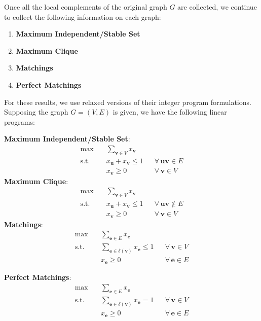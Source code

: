 \documentclass[12pt]{report} %
\begin{document}
\newpage 

Once all the local complements of the original graph $G$ are collected, we continue to 
collect the following information on each graph: 

\begin{enumerate}[label=(\roman*), font=\itshape]
    \item \textbf{Maximum Independent/Stable Set}
    \item \textbf{Maximum Clique}
    \item \textbf{Matchings}
    \item \textbf{Perfect Matchings}
\end{enumerate}

For these results, we use relaxed versions of their integer program formulations. Supposing the graph $G = (V, E)$ is given, 
we have the following linear programs: 

\vspace{1em}

\textbf{Maximum Independent/Stable Set}:
\[
    \begin{aligned}
        \max \quad & \sum_{\mathbf{v} \in V} x_\mathbf{v} \\
        \text{s.t.} \quad & x_\mathbf{u} + x_\mathbf{v} \le 1 && \forall\, \mathbf{u}\mathbf{v} \in E \\
        & x_{\mathbf{v}} \geq 0 && \forall\, \mathbf{v} \in V
    \end{aligned}
\]
\textbf{Maximum Clique}:
\[
    \begin{aligned}
        \max \quad & \sum_{\mathbf{v} \in V} x_\mathbf{v} \\
        \text{s.t.} \quad & x_\mathbf{u} + x_\mathbf{v} \le 1 && \forall\, \mathbf{u}\mathbf{v} \notin E \\
        & x_{\mathbf{v}} \geq 0 && \forall\, \mathbf{v} \in V
    \end{aligned}
\]
\textbf{Matchings}:
\[
    \begin{aligned}
        \max \quad & \sum_{\mathbf{e} \in E} x_\mathbf{e} \\
        \text{s.t.} \quad & \sum_{\mathbf{e} \in \delta(\mathbf{v})} x_\mathbf{e} \le 1 && \forall\, \mathbf{v} \in V \\
        & x_{\mathbf{e}} \geq 0 && \forall\, \mathbf{e} \in E
    \end{aligned}
\]

\textbf{Perfect Matchings}:
\[
    \begin{aligned}
        \max \quad & \sum_{\mathbf{e} \in E} x_\mathbf{e} \\
        \text{s.t.} \quad & \sum_{\mathbf{e} \in \delta(\mathbf{v})} x_\mathbf{e} = 1 && \forall\, \mathbf{v} \in V \\
        & x_{\mathbf{e}} \geq 0 && \forall\, \mathbf{e} \in E
    \end{aligned}
\]
\end{document}
